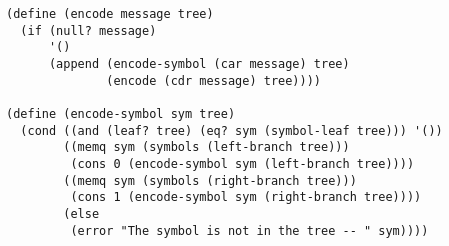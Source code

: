 \documentclass[a4paper,12pt]{article}
\begin{document}
\begin{lstlisting}
(define (encode message tree)
  (if (null? message)
      '()
      (append (encode-symbol (car message) tree)
              (encode (cdr message) tree))))

(define (encode-symbol sym tree)
  (cond ((and (leaf? tree) (eq? sym (symbol-leaf tree))) '())
        ((memq sym (symbols (left-branch tree)))
         (cons 0 (encode-symbol sym (left-branch tree))))
        ((memq sym (symbols (right-branch tree)))
         (cons 1 (encode-symbol sym (right-branch tree))))
        (else
         (error "The symbol is not in the tree -- " sym))))
\end{lstlisting}
\end{document}
